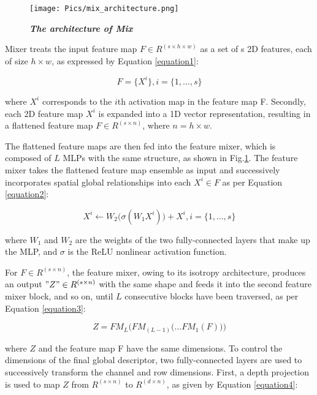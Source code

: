 \begin{figure}[!t]
\renewcommand{\thefigure}{4}
    \centering
    \texttt{[image: Pics/mix\_architecture.png]}
    \vspace{-1em}
    \caption{\emph{\textbf{The architecture of Mix}}}
    \label{fig:mix_architecture}
\end{figure}

Mixer treats the input feature map $F\in R^{(s\times h\times w)}$ as a set of s 2D features, each of size $h\times w$, as expressed by Equation \ref{equation1}:

\begin{equation}
\label{equation1}
    F=\{X^{i} \}, i=\{1,…,s\}
\end{equation}

where $X^i$ corresponds to the $i$th activation map in the feature map F. Secondly, each 2D feature map $X^i$ is expanded into a 1D vector representation, resulting in a flattened feature map $F\in R^{(s\times n)}$, where $n=h\times w$.

The flattened feature maps are then fed into the feature mixer, which is composed of $L$ MLPs with the same structure, as shown in Fig.\ref{fig:mix_architecture}. The feature mixer takes the flattened feature map ensemble as input and successively incorporates spatial global relationships into each ${X^i}\in F$ as per Equation \ref{equation2}:


\begin{equation}
\label{equation2}
    {X^i}\gets{W_2}{\big(}\sigma({W_1}{X^i} ){\big)}+{X^i},i=\{1,…,s\}
\end{equation}

where $W_1$ and $W_2$ are the weights of the two fully-connected layers that make up the MLP, and $\sigma$ is the ReLU nonlinear activation function.

For $F\in R^{(s\times n)}$, the feature mixer, owing to its isotropy architecture, produces an output $"Z"\in R^{(s\times n)}$ with the same shape and feeds it into the second feature mixer block, and so on, until $L$ consecutive blocks have been traversed, as per Equation \ref{equation3}:

\begin{equation}
\label{equation3}
   Z={FM_L}{\Big(}FM_{(L-1)}{\big(}…{FM_1} (F){\big)}{\Big)}
\end{equation}

where $Z$ and the feature map F have the same dimensions. To control the dimensions of the final global descriptor, two fully-connected layers are used to successively transform the channel and row dimensions. First, a depth projection is used to map $Z$ from $R^{(s\times n)}$ to $R^{(d\times n)}$, as given by Equation \ref{equation4}:

